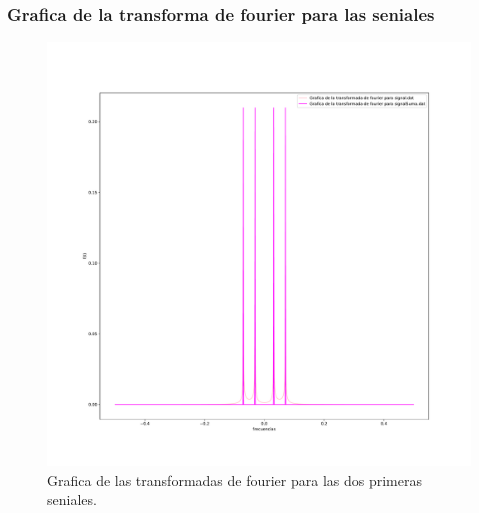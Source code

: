 \documentclass[11pt,letterpaper]{exam}
\begin{document}
\subsubsection{Grafica de la transforma de fourier para las seniales}
\begin{figure}[H]
    \centering
    \includegraphics[width=1\textwidth]{Fourier_trans.pdf}
    \caption{Grafica de las transformadas de fourier para las dos primeras seniales.}
    \label{fig:my_label}
\end{figure}
\end{document}
